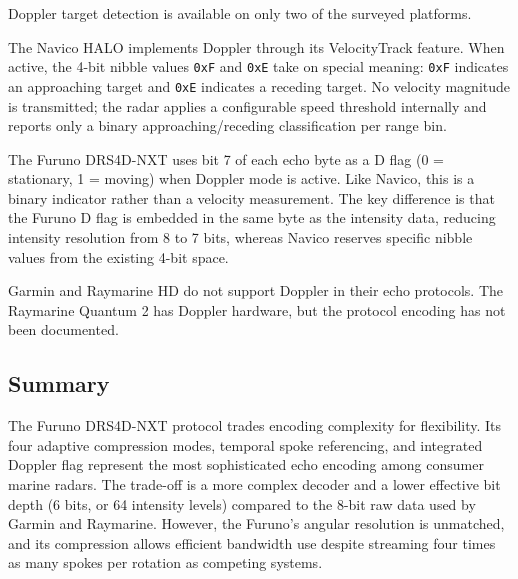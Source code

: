 \documentclass[11pt,letterpaper]{article}
\begin{document}
Doppler target detection is available on only two of the surveyed platforms.

The Navico HALO implements Doppler through its VelocityTrack feature. When active, the 4-bit nibble values \texttt{0xF} and \texttt{0xE} take on special meaning: \texttt{0xF} indicates an approaching target and \texttt{0xE} indicates a receding target. No velocity magnitude is transmitted; the radar applies a configurable speed threshold internally and reports only a binary approaching/receding classification per range bin.

The Furuno DRS4D-NXT uses bit 7 of each echo byte as a D flag (0 = stationary, 1 = moving) when Doppler mode is active. Like Navico, this is a binary indicator rather than a velocity measurement. The key difference is that the Furuno D flag is embedded in the same byte as the intensity data, reducing intensity resolution from 8 to 7 bits, whereas Navico reserves specific nibble values from the existing 4-bit space.

Garmin and Raymarine HD do not support Doppler in their echo protocols. The Raymarine Quantum 2 has Doppler hardware, but the protocol encoding has not been documented.

\subsection{Summary}

The Furuno DRS4D-NXT protocol trades encoding complexity for flexibility. Its four adaptive compression modes, temporal spoke referencing, and integrated Doppler flag represent the most sophisticated echo encoding among consumer marine radars. The trade-off is a more complex decoder and a lower effective bit depth (6 bits, or 64 intensity levels) compared to the 8-bit raw data used by Garmin and Raymarine. However, the Furuno's angular resolution is unmatched, and its compression allows efficient bandwidth use despite streaming four times as many spokes per rotation as competing systems.


\end{document}

